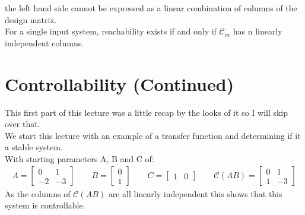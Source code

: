 \documentclass[a4paper,11pt]{article}
\begin{document}
	the left hand side cannot be expressed as a linear combination of columns of the design matrix.\\
	For a single input system, reachability exists if and only if $\mathcal{C}_m$ has n linearly independent columns.  
	
	\section{Controllability (Continued)}
		 This first part of this lecture was a little recap by the looks of it so I will skip over that.\\
		We start this lecture with an example of a transfer function and determining if it a stable system.\\ 
		With starting parameters A, B and C of:
		\begin{gather}
			A= 
			\begin{bmatrix}
				0 & 1 \\
				-2 & -3 
			\end{bmatrix}
			\qquad 
			B = 
			\begin{bmatrix}
				0 \\ 1 
			\end{bmatrix}
			\qquad 
			C = 	
			\begin{bmatrix}
				1 & 0 
			\end{bmatrix}
			\qquad			
			\mathcal{C}(AB) = 
			\begin{bmatrix}
				0 & 1 \\
				1 & -3 
			\end{bmatrix}
		\end{gather}
		As the columns of $\mathcal{C}(AB)$ are all linearly independent this shows that this system is controllable.\\
\end{document}
